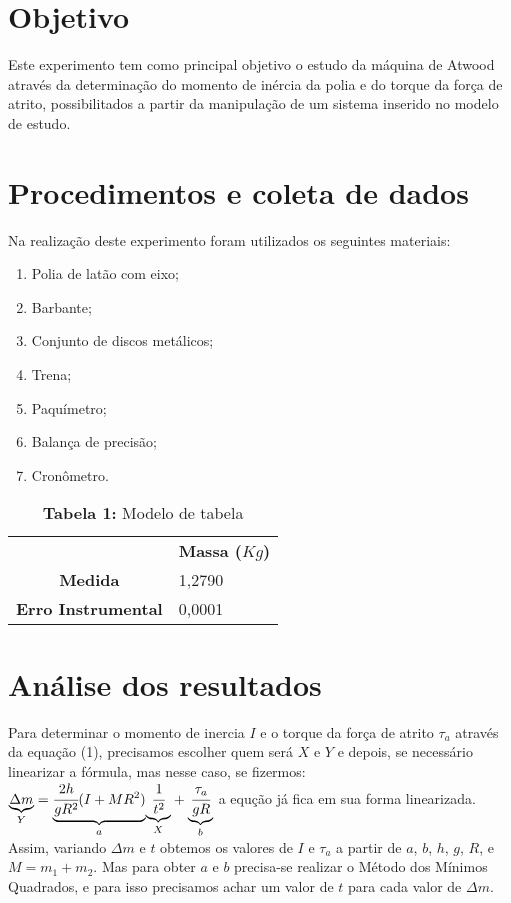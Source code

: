 \documentclass[a4paper]{article}
\begin{document}
\section{Objetivo}
Este experimento tem como principal objetivo o estudo da máquina de Atwood através da determinação do momento de inércia da polia e do torque da força de atrito, possibilitados a partir da manipulação de um sistema inserido no modelo de estudo.


\section{Procedimentos e coleta de dados}

Na realização deste experimento foram utilizados os seguintes materiais: 
\begin{enumerate} 
	\item Polia de latão com eixo;
	\item Barbante;
	\item Conjunto de discos metálicos;
	\item Trena;
	\item Paquímetro;
	\item Balança de precisão;
	\item Cronômetro.
 \end {enumerate} 

\begin{table}[!ht]
	\begin{center}
		\caption*{\textbf{Tabela 1:} Modelo de tabela}
		\begin{tabular}{| l | l |}
			\cline{2-2} \multicolumn{0}{c|}{ } & \multicolumn{1}{c|}{\textbf{Massa ($Kg$)}} \\  \cline{1-2}
			\multicolumn{0}{|c|}{\textbf{Medida}} & 1,2790\\ \hline
			\multicolumn{0}{|c|}{\textbf{Erro Instrumental}} & 0,0001\\ \hline
		\end{tabular}
	\end{center}
\end{table}

\section{Análise dos resultados}

Para determinar o momento de inercia $I$ e o torque da força de atrito $\tau_{a}$ através da equação (1), precisamos escolher quem será $X$ e $Y$ e depois, se necessário linearizar a fórmula, mas nesse caso, se fizermos: $\underset{Y}{\underbrace{\Delta m}}=\underset{a}{\underbrace{\cfrac{2h}{gR^{2}}(I+MR^{2})}}\underset{X}{\underbrace{\ensuremath{\cfrac{1}{t^{2}}}}}+\underset{b}{\underbrace{\cfrac{\tau_{a}}{gR}}}$ a equção já fica em sua forma linearizada. Assim, variando $\Delta m$ e $t$ obtemos os valores de $I$ e $\tau_{a}$ a partir de $a$, $b$, $h$, $g$, $R$, e $M=m_{1}+m_{2}$.
Mas para obter $a$ e $b$ precisa-se realizar o Método dos Mínimos Quadrados, e para isso precisamos achar um valor de $t$ para cada valor de $\Delta m$.
\end{document}
